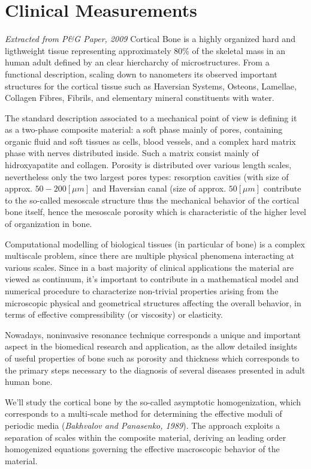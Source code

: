 \chapter{Clinical Measurements}
\textit{Extracted from P\&G Paper, 2009} Cortical Bone is a highly organized hard and ligthweight tissue representing approximately 80\% of the skeletal mass in an human adult defined by an clear hiercharchy of microstructures. From a functional description, scaling down to nanometers its observed important structures for the cortical tissue such as Haversian Systems, Osteons, Lamellae, Collagen Fibres, Fibrils, and elementary mineral constituents with water. 

The standard description associated to a mechanical point of view is defining it as a two-phase composite material: a soft phase mainly of pores, containing organic fluid and soft tissues as cells, blood vessels, and a complex hard matrix phase with nerves distributed inside. Such a matrix consist mainly of hidroxyapatite and collagen. Porosity is distributed over various length scales, nevertheless only the two largest pores types: resorption cavities (with size of approx. $50-200 [\mu m]$ and Haversian canal (size of approx. $50 [ \mu m ]$ contribute to the so-called mesoscale structure thus the mechanical behavior of the cortical bone itself, hence the mesoscale porosity which is characteristic of the higher level of organization in bone. 

Computational modelling of biological tissues (in particular of bone) is a complex multiscale problem, since there are multiple physical phenomena interacting at various scales. Since in a bast majority of clinical applications the material are viewed as continuum, it's important to contribute in a mathematical model and numerical procedure to characterize non-trivial properties arising from the microscopic physical and geometrical structures affecting the overall behavior, in terms of effective compressibility (or viscosity) or elasticity. 

Nowadays, noninvasive resonance technique corresponds a unique and important aspect in the biomedical research and application, as the allow detailed insights of useful properties of bone such as porosity and thickness which corresponds to the primary steps necessary to the diagnosis of several diseases presented in adult human bone.

We'll study the cortical bone by the so-called asymptotic homogenization, which corresponds to a multi-scale method for determining the effective moduli of periodic media (\textit{Bakhvalov and Panasenko, 1989}). The approach exploits a separation of scales within the composite material, deriving an leading order homogenized equations governing the effective macroscopic behavior of the material.\\


